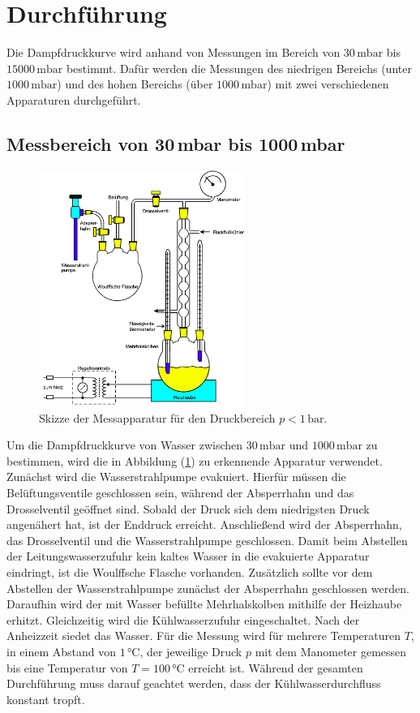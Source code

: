 \section{Durchführung}
\label{sec:Durchführung}
Die Dampfdruckkurve wird anhand von Messungen im Bereich von $30\,\unit{\milli\bar}$ bis $15000\, \unit{\milli\bar}$ bestimmt.
Dafür werden die Messungen des niedrigen Bereichs (unter $1000\, \unit{\milli\bar}$) und des hohen Bereichs (über $1000\, \unit{\milli\bar}$)
mit zwei verschiedenen Apparaturen durchgeführt.
\subsection{Messbereich von 30\,mbar bis 1000\,mbar}
\label{sec:ErsteDurchführung}
\begin{figure}[H]
    \centering
    \includegraphics[width=0.60\textwidth]{Erste_Apparatur.png}
    \caption{Skizze der Messapparatur für den Druckbereich $p<1\,\unit{\bar}$. \cite{anleitungV203}}
    \label{fig:ErsteApparatur}
\end{figure}
Um die Dampfdruckkurve von Wasser zwischen $30\,\unit{\milli\bar}$ und $1000\,\unit{\milli\bar}$ zu bestimmen, wird die in Abbildung
(\ref{fig:ErsteApparatur}) zu erkennende Apparatur verwendet. Zunächst wird die Wasserstrahlpumpe evakuiert. Hierfür müssen die Belüftungsventile geschlossen sein, während der Absperrhahn
und das Drosselventil geöffnet sind. Sobald der Druck sich dem niedrigsten Druck angenähert hat, ist der Enddruck erreicht.  
Anschließend wird der Absperrhahn, das Drosselventil und die Wasserstrahlpumpe geschlossen. Damit beim Abstellen der Leitungswasserzufuhr kein kaltes Wasser in die
evakuierte Apparatur eindringt, ist die Woulffsche Flasche vorhanden. Zusätzlich sollte vor dem Abstellen der Wasserstrahlpumpe zunächst der Absperrhahn geschlossen werden.
Daraufhin wird der mit Wasser befüllte Mehrhalskolben mithilfe der Heizhaube erhitzt. Gleichzeitig wird die Kühlwasserzufuhr eingeschaltet. Nach der Anheizzeit siedet das Wasser.
Für die Messung wird für mehrere Temperaturen $T$, in einem Abstand von $1\,\unit{\celsius}$, der jeweilige Druck $p$ mit dem Manometer gemessen bis eine Temperatur von $T= 100\,\unit{\celsius}$ erreicht ist.
Während der gesamten Durchführung muss darauf geachtet werden, dass der Kühlwasserdurchfluss konstant tropft.
